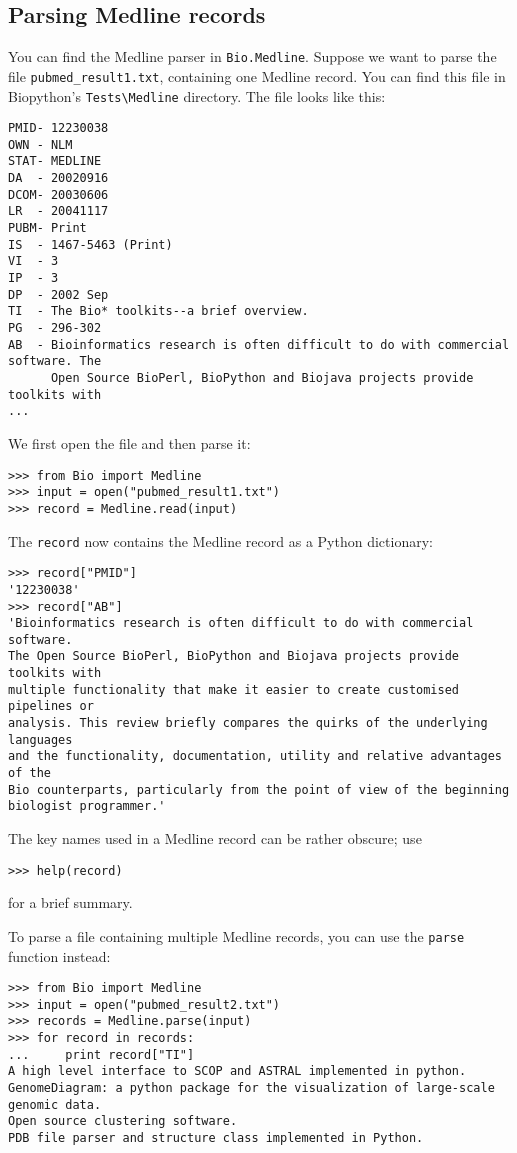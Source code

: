 \documentclass{report}
\begin{document}
\subsection{Parsing Medline records}
\label{subsec:entrez-and-medline}
You can find the Medline parser in \verb+Bio.Medline+. Suppose we want to parse the file \verb+pubmed_result1.txt+, containing one Medline record. You can find this file in Biopython's \verb+Tests\Medline+ directory. The file looks like this:

\begin{verbatim}
PMID- 12230038
OWN - NLM
STAT- MEDLINE
DA  - 20020916
DCOM- 20030606
LR  - 20041117
PUBM- Print
IS  - 1467-5463 (Print)
VI  - 3
IP  - 3
DP  - 2002 Sep
TI  - The Bio* toolkits--a brief overview.
PG  - 296-302
AB  - Bioinformatics research is often difficult to do with commercial software. The
      Open Source BioPerl, BioPython and Biojava projects provide toolkits with
...
\end{verbatim}
We first open the file and then parse it:
\begin{verbatim}
>>> from Bio import Medline
>>> input = open("pubmed_result1.txt")
>>> record = Medline.read(input)
\end{verbatim}
The \verb+record+ now contains the Medline record as a Python dictionary:
\begin{verbatim}
>>> record["PMID"]
'12230038'
>>> record["AB"]
'Bioinformatics research is often difficult to do with commercial software.
The Open Source BioPerl, BioPython and Biojava projects provide toolkits with
multiple functionality that make it easier to create customised pipelines or
analysis. This review briefly compares the quirks of the underlying languages
and the functionality, documentation, utility and relative advantages of the
Bio counterparts, particularly from the point of view of the beginning
biologist programmer.'
\end{verbatim}
The key names used in a Medline record can be rather obscure; use
\begin{verbatim}
>>> help(record)
\end{verbatim}
for a brief summary.

To parse a file containing multiple Medline records, you can use the \verb+parse+ function instead:
\begin{verbatim}
>>> from Bio import Medline
>>> input = open("pubmed_result2.txt")
>>> records = Medline.parse(input)
>>> for record in records:
...     print record["TI"]
A high level interface to SCOP and ASTRAL implemented in python.
GenomeDiagram: a python package for the visualization of large-scale genomic data.
Open source clustering software.
PDB file parser and structure class implemented in Python.
\end{verbatim}
\end{document}
